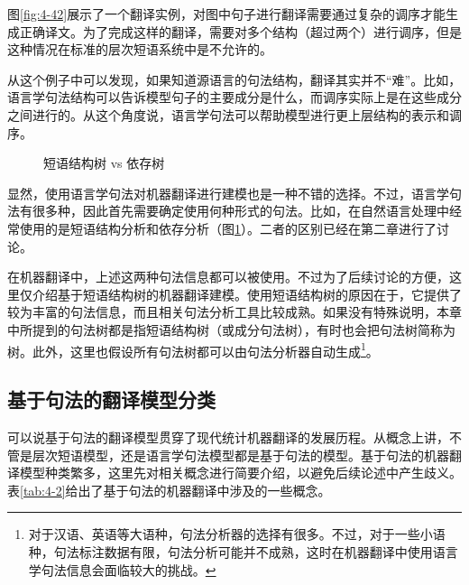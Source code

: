 \parinterval 图\ref{fig:4-42}展示了一个翻译实例，对图中句子进行翻译需要通过复杂的调序才能生成正确译文。为了完成这样的翻译，需要对多个结构（超过两个）进行调序，但是这种情况在标准的层次短语系统中是不允许的。

\parinterval 从这个例子中可以发现，如果知道源语言的句法结构，翻译其实并不``难''。比如，语言学句法结构可以告诉模型句子的主要成分是什么，而调序实际上是在这些成分之间进行的。从这个角度说，语言学句法可以帮助模型进行更上层结构的表示和调序。

\begin{figure}[htp]
\centering

\setlength{\belowcaptionskip}{-1.0em}
\caption{短语结构树 vs 依存树}
\label{fig:4-43}
\end{figure}

\parinterval 显然，使用语言学句法对机器翻译进行建模也是一种不错的选择。不过，语言学句法有很多种，因此首先需要确定使用何种形式的句法。比如，在自然语言处理中经常使用的是短语结构分析和依存分析（图\ref{fig:4-43}）。二者的区别已经在第二章进行了讨论。

\parinterval 在机器翻译中，上述这两种句法信息都可以被使用。不过为了后续讨论的方便，这里仅介绍基于短语结构树的机器翻译建模。使用短语结构树的原因在于，它提供了较为丰富的句法信息，而且相关句法分析工具比较成熟。如果没有特殊说明，本章中所提到的句法树都是指短语结构树（或成分句法树），有时也会把句法树简称为树。此外，这里也假设所有句法树都可以由句法分析器自动生成\footnote[7]{对于汉语、英语等大语种，句法分析器的选择有很多。不过，对于一些小语种，句法标注数据有限，句法分析可能并不成熟，这时在机器翻译中使用语言学句法信息会面临较大的挑战。}。


\subsection{基于句法的翻译模型分类}

\parinterval 可以说基于句法的翻译模型贯穿了现代统计机器翻译的发展历程。从概念上讲，不管是层次短语模型，还是语言学句法模型都是基于句法的模型。基于句法的机器翻译模型种类繁多，这里先对相关概念进行简要介绍，以避免后续论述中产生歧义。表\ref{tab:4-2}给出了基于句法的机器翻译中涉及的一些概念。


